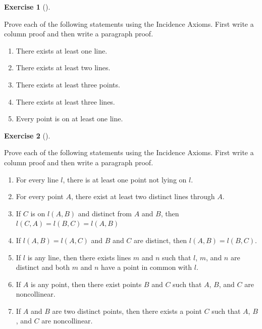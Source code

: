 \documentclass[
  letterpaper,
  10pt,
  reqno,
  twopage,
  openany]{book}
\providecommand{\tightlist}{%
  \setlength{\itemsep}{0pt}\setlength{\parskip}{0pt}}\usepackage{longtable,booktabs,array}
\theoremstyle{plain}
\theoremstyle{definition}
\newtheorem{exercise}{Exercise}[chapter]
\theoremstyle{definition}
\theoremstyle{definition}
\theoremstyle{plain}
\theoremstyle{plain}
\theoremstyle{remark}
\begin{document}
\leavevmode{}%
\begin{exercise}[]\label{exr-inaxst}

Prove each of the following statements using the Incidence Axioms. First
write a column proof and then write a paragraph proof.

\begin{enumerate}
\def\labelenumi{\arabic{enumi}.}
\tightlist
\item
  There exists at least one line.
\item
  There exists at least two lines.
\item
  There exists at least three points.
\item
  There exists at least three lines.
\item
  Every point is on at least one line.
\end{enumerate}

\end{exercise}

\leavevmode{}%
\begin{exercise}[]\label{exr-incidence3}

Prove each of the following statements using the Incidence Axioms. First
write a column proof and then write a paragraph proof.

\begin{enumerate}
\def\labelenumi{\arabic{enumi}.}
\tightlist
\item
  For every line \(l\), there is at least one point not lying on \(l\).
\item
  For every point \(A\), there exist at least two distinct lines through
  \(A.\)
\item
  If \(C\) is on \(l(A,B)\) and distinct from \(A\) and \(B\), then
  \(l(C,A) = l(B,C) = l(A,B)\)
\item
  If \(l(A,B) = l(A,C)\) and \(B\) and \(C\) are distinct, then
  \(l(A,B) = l(B,C)\).
\item
  If \(l\) is any line, then there exists lines \(m\) and \(n\) such
  that \(l\), \(m\), and \(n\) are distinct and both \(m\) and \(n\)
  have a point in common with \(l\).
\item
  If \(A\) is any point, then there exist points \(B\) and \(C\) such
  that \(A\), \(B\), and \(C\) are noncollinear.
\item
  If \(A\) and \(B\) are two distinct points, then there exists a point
  \(C\) such that \(A\), \(B\), and \(C\) are noncollinear.
\end{enumerate}

\end{exercise}
\end{document}
